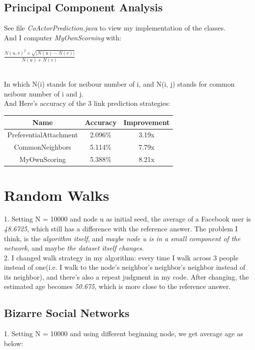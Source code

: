 \documentclass[11pt]{article} %
\begin{document}
\subsection{Principal Component Analysis}
See file \emph{CoActorPrediction.java} to view my implementation of the classes.
\\
And I computer \emph{MyOwnScorning} with:
\\
\centerline{$\frac{N(u, v)^{2} \times \sqrt{|N(u)-N(v)|}}{N(u) + N(v)}$}
\\
In which N(i) stands for neibour number of i, and N(i, j) stands for common neibour number of i and j.
\\
And Here's accuracy of the 3 link prediction strategies: 

\begin{table}[!hbp]
\centering
\begin{tabular}{|c|c|c|}
\hline
Name & Accuracy & Improvement \\
\hline
PreferentialAttachment & 2.096\% & 3.19x \\
\hline
CommonNeighbors & 5.114\% & 7.79x \\
\hline
MyOwnScoring & 5.388\% & 8.21x \\
\hline
\end{tabular}
\end{table}

\section{Random Walks}
1. Setting N = 10000 and node u as initial seed, the average of a Facebook user is \emph{48.6725}, which still has a difference with the reference answer. The problem I think, is the \emph{algorithm itself}, and \emph{maybe node u is in a small component of the network}, and maybe \emph{the dataset itself changes}.
\\
2. I changed walk strategy in my algorithm: every time I walk across 3 people instead of one(i.e. I walk to the node's neighbor's neighbor's neighbor instead of its neighbor), and there's also a repeat judgment in my code. After changing, the estimated age becomes \emph{50.675}, which is more close to the reference answer.
\\
\subsection{Bizarre Social Networks}
1. Setting N = 10000 and using different beginning node, we get average age as below: \\
\end{document}
